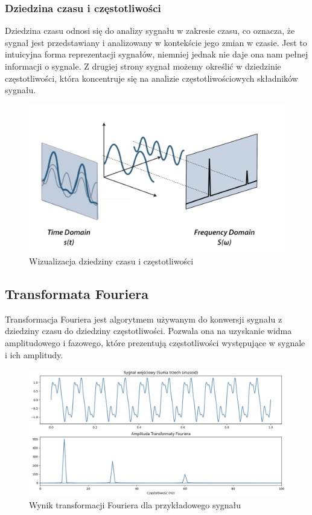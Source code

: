 \subsubsection{Dziedzina czasu i częstotliwości}

Dziedzina czasu odnosi się do analizy sygnału w zakresie czasu, co oznacza, że sygnał jest przedstawiany i analizowany w kontekście jego zmian w czasie. Jest to intuicyjna forma reprezentacji sygnałów, niemniej jednak nie daje ona nam pełnej informacji o sygnale. Z drugiej strony sygnał możemy określić w dziedzinie częstotliwości, która koncentruje się na analizie częstotliwościowych składników sygnału.


\begin{figure}[h]
    \centering
    \includegraphics[width=0.47\linewidth]{Rozdziały/02.Podstawy_teoretyczne/Obrazy/time-frequency-domain.png}
    \caption{Wizualizacja dziedziny czasu i częstotliwości}
    \label{fig:image22}
\end{figure}



\subsection*{Transformata Fouriera}

Transformacja Fouriera jest algorytmem używanym do konwersji sygnału z dziedziny czasu do dziedziny częstotliwości. Pozwala ona na uzyskanie widma amplitudowego i fazowego, które prezentują częstotliwości występujące w sygnale i ich amplitudy.

\begin{figure}[h]
    \centering
    \includegraphics[width=0.8\linewidth]{Rozdziały/02.Podstawy_teoretyczne/Obrazy/fft.png}
    \caption{Wynik transformacji Fouriera dla przykładowego sygnału}
    \label{fig:image23}
\end{figure}


